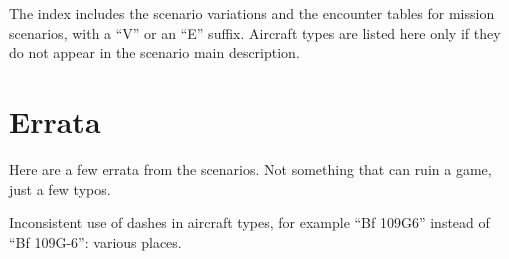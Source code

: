 \documentclass[a4paper,twocolumn]{article}
\begin{document}
The index includes the scenario variations and the encounter
tables for mission scenarios, with a ``V'' or an ``E''
suffix. Aircraft types are listed here only if they do not appear in the
scenario main description.

\vspace{1mm}


\section*{Errata}

Here are a few errata from the scenarios. Not something that can ruin a game, just
a few typos.

\vspace{1mm}

Inconsistent use of dashes in aircraft types, for example ``Bf 109G6''
instead of  ``Bf 109G-6'': various places.

\end{document}
